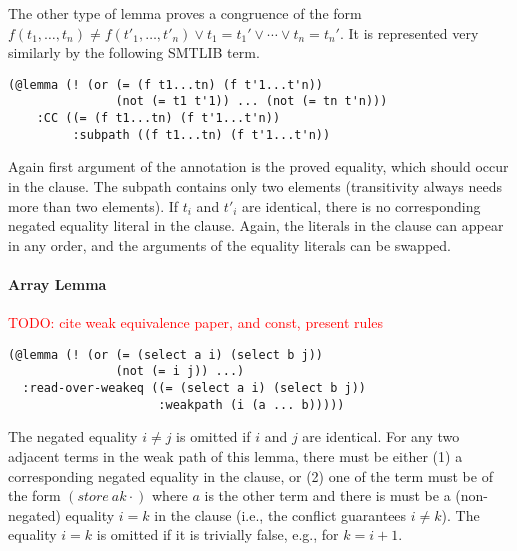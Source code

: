 \documentclass[a4paper]{article}
\newcommand\todo[1]{\textcolor{red}{TODO: #1}}
\begin{document}
The other type of lemma proves a congruence of the form $f(t_1, \dots,
t_n)\neq f(t'_1,\dots,t'_n) \lor t_1=t_1' \lor \cdots \lor t_n=t_n'$.
It is represented very similarly by the following SMTLIB term.

\begin{verbatim}
(@lemma (! (or (= (f t1...tn) (f t'1...t'n))
               (not (= t1 t'1)) ... (not (= tn t'n)))
    :CC ((= (f t1...tn) (f t'1...t'n)) 
         :subpath ((f t1...tn) (f t'1...t'n))
\end{verbatim}

Again first argument of the annotation is the proved equality, which
should occur in the clause.  The subpath contains only two
elements (transitivity always needs more than two elements).  If $t_i$
and $t'_i$ are identical, there is no corresponding negated equality
literal in the clause.  Again, the literals in the clause can appear
in any order, and the arguments of the equality literals can be
swapped.

\paragraph{Array Lemma}
\todo{cite weak equivalence paper, and const, present rules}

\begin{verbatim}
(@lemma (! (or (= (select a i) (select b j))
               (not (= i j)) ...)
  :read-over-weakeq ((= (select a i) (select b j))
                     :weakpath (i (a ... b)))))
\end{verbatim}
The negated equality $i\neq j$ is omitted if $i$ and $j$ are identical.
For any two adjacent terms in the weak path of this lemma, there must be either
(1) a corresponding negated equality in the clause, or (2) one of the term must be of
the form $(store\ a k \cdot)$ where $a$ is the other term and there is must be
a (non-negated) equality $i=k$ in the clause (i.e., the conflict guarantees $i\neq k$).
The equality $i=k$ is omitted if it is trivially false, e.g., for $k = i+1$.
\end{document}
